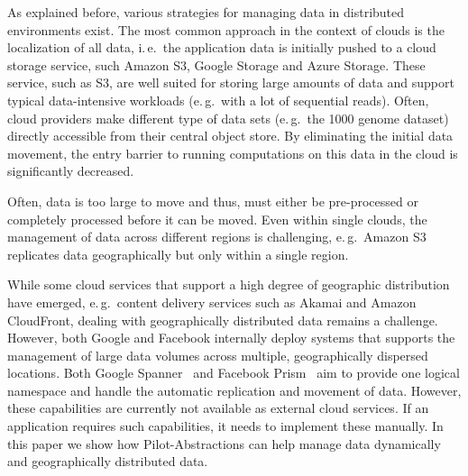 \documentclass[times]{cpeauth}
\newcommand{\pilot}{Pilot\xspace}
\begin{document}
As explained before, various strategies for managing data in distributed
environments exist. The most common approach in the context of clouds is the
localization of all data, i.\,e.\ the application data is initially pushed to
a cloud storage service, such Amazon S3, Google Storage and Azure Storage.
These service, such as S3, are well suited for storing large amounts of data 
and support typical data-intensive workloads (e.\,g.\ with a lot of sequential
reads). Often, cloud providers make different type of data sets (e.\,g.\ the
1000 genome dataset) directly accessible from their central object store. By
eliminating the initial data movement, the entry barrier to running
computations on this data in the cloud is significantly decreased.

Often, data is too large to move and thus, must either be
pre-processed or completely processed before it can be moved. Even within
single clouds, the management of data across different regions is challenging, 
e.\,g.\ Amazon S3  replicates data geographically but only within a single
region.

While some cloud services that support a high degree of geographic
distribution have emerged, e.\,g.\ content delivery services such as
Akamai and Amazon CloudFront, dealing with geographically distributed
data remains a challenge. However, both Google and Facebook internally
deploy systems that supports the management of large data volumes
across multiple, geographically dispersed locations. Both Google
Spanner~\cite{dean09} and Facebook Prism~\cite{Metz12} aim to provide
one logical namespace and handle the automatic replication and
movement of data. However, these capabilities are currently not
available as external cloud services. If an application requires such
capabilities, it needs to implement these manually.  In this paper we
show how \pilot-Abstractions can help manage data dynamically and
geographically distributed data.
\end{document}

